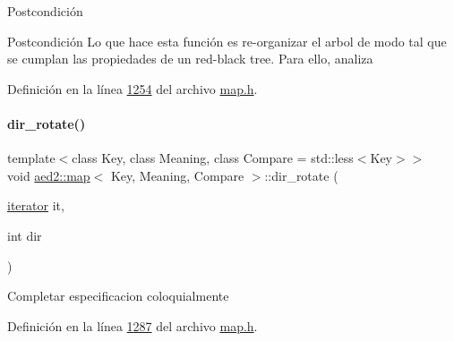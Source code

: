 \begin{DoxyPostcond}{\-Postcondición}
\begin{DoxyPostcond}{\-Postcondición}
Lo que hace esta función es re-\/organizar el arbol de modo tal que se cumplan las propiedades de un red-\/black tree. Para ello, analiza 

Definición en la línea \hyperlink{map_8h_source_l01254}{1254} del archivo \hyperlink{map_8h_source}{map.\+h}.

\mbox{\label{classaed2_1_1map_a94f2862ada0c9ed4f4457eac42ea8f23_a94f2862ada0c9ed4f4457eac42ea8f23}} 
\paragraph{\texorpdfstring{dir\+\_\+rotate()}{dir\_rotate()}}
{\footnotesize\ttfamily template$<$class Key, class Meaning, class Compare = std\+::less$<$\+Key$>$$>$ \\
void \hyperlink{classaed2_1_1map}{aed2\+::map}$<$ Key, Meaning, Compare $>$\+::dir\+\_\+rotate (\begin{DoxyParamCaption}\item[{\hyperlink{classaed2_1_1map_1_1iterator}{iterator}}]{it,  }\item[{int}]{dir }\end{DoxyParamCaption})\hspace{0.3cm}{\ttfamily [inline]}}

Completar especificacion coloquialmente 

Definición en la línea \hyperlink{map_8h_source_l01287}{1287} del archivo \hyperlink{map_8h_source}{map.\+h}.

\mbox{\label{classaed2_1_1map_a2ef6723c183916276b0afc4a4c721475_a2ef6723c183916276b0afc4a4c721475}} 

\end{DoxyPostcond}
\end{DoxyPostcond}
